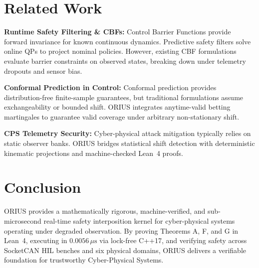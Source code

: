 \documentclass[conference]{IEEEtran}
\begin{document}
\section{Related Work}
\textbf{Runtime Safety Filtering \& CBFs:} Control Barrier Functions \cite{ames_cbf_2019,annurev_safety_filter_2024} provide forward invariance for known continuous dynamics. Predictive safety filters \cite{wabersich_predictive_2021} solve online QPs to project nominal policies. However, existing CBF formulations evaluate barrier constraints on observed states, breaking down under telemetry dropouts and sensor bias.

\textbf{Conformal Prediction in Control:} Conformal prediction \cite{romano_cqr_2019,gibbs_aci_2021} provides distribution-free finite-sample guarantees, but traditional formulations assume exchangeability or bounded shift. ORIUS integrates anytime-valid betting martingales \cite{ville_1939} to guarantee valid coverage under arbitrary non-stationary shift.

\textbf{CPS Telemetry Security:} Cyber-physical attack mitigation \cite{cardenas_cps_security_2008,shoukry_imhotep_2017} typically relies on static observer banks. ORIUS bridges statistical shift detection with deterministic kinematic projections and machine-checked Lean~4 proofs.

\section{Conclusion}
ORIUS provides a mathematically rigorous, machine-verified, and sub-microsecond real-time safety interposition kernel for cyber-physical systems operating under degraded observation. By proving Theorems A, F, and G in Lean~4, executing in $0.0056\,\mu\text{s}$ via lock-free C++17, and verifying safety across SocketCAN HIL benches and six physical domains, ORIUS delivers a verifiable foundation for trustworthy Cyber-Physical Systems.
\end{document}
